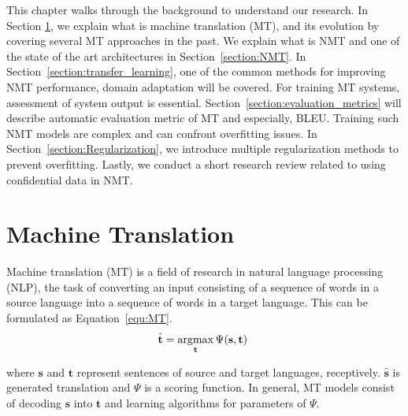 \newcommand{\SK}[1]{{\small\textcolor{blue}{[NOTE: #1]}}}
This chapter walks through the background to understand our research. In Section \ref{section:MT}, we explain what is machine translation (MT), and its evolution by covering several MT approaches in the past. We explain what is NMT and one of the state of the art architectures in Section~\ref{section:NMT}. In Section~\ref{section:transfer_learning}, one of the common methods for improving NMT performance, domain adaptation will be covered. For training MT systems, assessment of system output is essential. Section~\ref{section:evaluation_metrics} will describe automatic evaluation metric of MT and especially, BLEU. Training such NMT models are complex and can confront overfitting issues. In Section~\ref{section:Regularization}, we introduce multiple regularization methods to prevent overfitting. Lastly, we conduct a short research review related to using confidential data in NMT. 


\section{Machine Translation}\label{section:MT}

Machine translation (MT) is a field of research in natural language processing (NLP), the task of converting an input consisting of a sequence of words in a source language into a sequence of words in a target language. %
This can be formulated as Equation~\ref{equ:MT}. %
\begin{equation}
    \hat{\textbf{t}} = \operatorname*{argmax}_{\textbf{t}}\Psi(\textbf{s}, \textbf{t})\
    \label{equ:MT}
\end{equation}

where $\textbf{s}$ and $\textbf{t}$ represent sentences of source and target languages, receptively. $\hat{\textbf{s}}$ is generated translation and $\Psi$ is a scoring function. In general, MT models consist of decoding $\textbf{s}$ into $\textbf{t}$ and learning algorithms for parameters of $\Psi$.

